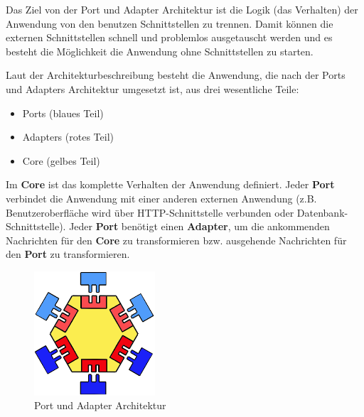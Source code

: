 Das Ziel von der Port und Adapter Architektur ist die Logik (das Verhalten) der Anwendung von
den benutzen Schnittstellen zu trennen. Damit können die externen Schnittstellen schnell und problemlos ausgetauscht werden und
es besteht die Möglichkeit die Anwendung ohne Schnittstellen zu starten. 

Laut der Architekturbeschreibung besteht die Anwendung, die nach der Ports und Adapters Architektur umgesetzt ist, aus drei wesentliche Teile:
\begin{itemize}
    \item Ports (blaues Teil)
    \item Adapters (rotes Teil)
    \item Core (gelbes Teil)
\end{itemize}

Im \textbf{Core} ist das komplette Verhalten der Anwendung definiert.
Jeder \textbf{Port} verbindet die Anwendung mit einer anderen externen Anwendung (z.B. Benutzeroberfläche wird über HTTP-Schnittstelle verbunden oder Datenbank-Schnittstelle).
Jeder \textbf{Port} benötigt einen \textbf{Adapter}, um die ankommenden Nachrichten für den \textbf{Core} zu transformieren bzw. 
ausgehende Nachrichten für den \textbf{Port} zu transformieren.\cite{portAndAdapter}

\begin{figure}[H]
    \centering
    \includegraphics[width=0.4\textwidth]{./images/ports-and-adapters.png}
    \caption[Port und Adapter Architektur]{Port und Adapter Architektur \footnotemark}
    \label{fig:PortAndAdapterArchitecture}
\end{figure}
